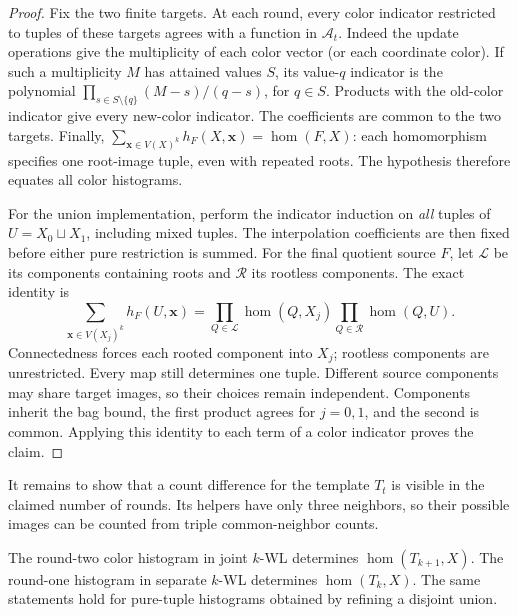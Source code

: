 \begin{proof}
Fix the two finite targets. At each round, every color indicator
restricted to tuples of these targets agrees with a function in
\(\mathcal A_t\). Indeed the update operations give the
multiplicity of each color vector (or each coordinate color).
If such a multiplicity \(M\) has attained values \(S\), its value-\(q\)
indicator is the polynomial
\(\prod_{s\in S\setminus\{q\}}(M-s)/(q-s)\), for \(q\in S\).
Products with the old-color indicator give every new-color indicator.
The coefficients are common to the two targets. Finally,
\(\sum_{\mathbf x\in V(X)^k}h_F(X,\mathbf x)=\hom(F,X)\):
each homomorphism specifies one root-image tuple, even with repeated
roots. The hypothesis therefore equates all color histograms.

For the union implementation, perform the indicator induction on
\emph{all} tuples of \(U=X_0\sqcup X_1\), including mixed tuples.
The interpolation coefficients are then fixed before either pure
restriction is summed. For the final quotient source \(F\), let
\(\mathcal L\) be its components containing roots and \(\mathcal R\)
its rootless components. The exact identity is
\begin{equation}\label{eq:pure-tuple-factorization}
 \sum_{\mathbf x\in V(X_j)^k}h_F(U,\mathbf x)
   =\prod_{Q\in\mathcal L}\hom(Q,X_j)
      \prod_{Q\in\mathcal R}\hom(Q,U).
\end{equation}
Connectedness forces each rooted component into \(X_j\); rootless
components are unrestricted. Every map still determines one tuple.
Different source components may share target images, so their choices
remain independent. Components inherit the bag bound, the first
product agrees for \(j=0,1\), and the second is common.
Applying this identity to each term of a color indicator proves the
claim.
\end{proof}

It remains to show that a count difference for the template \(T_t\)
is visible in the claimed number of rounds. Its helpers have only
three neighbors, so their possible images can be counted from
triple common-neighbor counts.

\begin{lemma}\label{lem:test-detected}
The round-two color histogram in joint \(k\)-WL determines
\(\hom(T_{k+1},X)\). The round-one histogram in separate \(k\)-WL
determines \(\hom(T_k,X)\). The same statements hold for pure-tuple
histograms obtained by refining a disjoint union.
\end{lemma}

